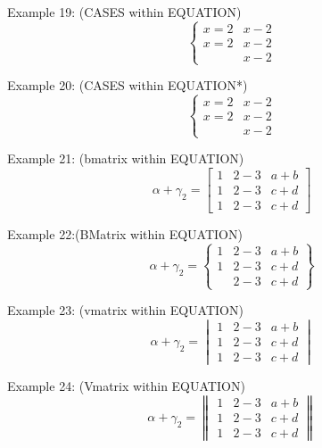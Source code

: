 \documentclass{book}
\begin{document}
\noindent Example 19: (CASES within EQUATION)
\begin{equation}
\begin{cases}
x=2 &x-2\\
x=2 &x-2\\
    &x-2
\end{cases}
\end{equation}

\noindent Example 20: (CASES within EQUATION*)
\begin{equation*}
\begin{cases}
x=2&x-2\\
x=2&x-2 \\
   &x-2
\end{cases}
\end{equation*}

\noindent Example 21: (bmatrix within EQUATION)
\begin{equation}
\alpha + \gamma_{2} = \begin{bmatrix}
1 &2-3 &a+b\\ 
1 &2-3 &c+d\\
1 &2-3 &c+d
\end{bmatrix}
\end{equation}

\noindent Example 22:(BMatrix within EQUATION)
\begin{equation*}
\alpha + \gamma_{2} = \begin{Bmatrix}
1 &2-3 &a+b\\ 
1 &2-3 &c+d\\
  &2-3 &c+d
\end{Bmatrix}
\end{equation*}

\noindent Example 23: (vmatrix within EQUATION)
\begin{equation*}
\alpha + \gamma_{2} = \begin{vmatrix}
1 &2-3 &a+b\\ 
1 &2-3 &c+d\\
1 &2-3 &c+d
\end{vmatrix}
\end{equation*}

\noindent Example 24: (Vmatrix within EQUATION)
\begin{equation*}
\alpha + \gamma_{2} = \begin{Vmatrix}
1 &2-3 &a+b\\ 
1 &2-3 &c+d\\
1 &2-3 &c+d
\end{Vmatrix}
\end{equation*}
\end{document}
